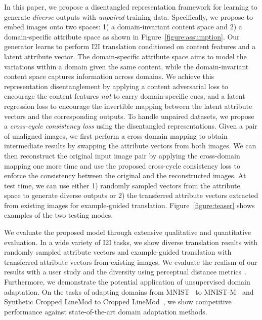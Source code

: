 \documentclass[runningheads]{llncs}
\newcommand{\figref}[1]{Figure~\ref{figure:#1}}
\begin{document}
In this paper, we propose a disentangled representation framework for learning to generate \emph{diverse} outputs with \emph{unpaired} training data.
Specifically, we propose to embed images onto two spaces: 
1) a domain-invariant content space and 2) a domain-specific attribute space as shown in \figref{assumption}.
Our generator learns to perform I2I translation conditioned on content features and a latent attribute vector. 
The domain-specific attribute space aims to model the variations within a domain given the same content, while the domain-invariant content space captures information across domains.
We achieve this representation disentanglement by applying a content adversarial loss to encourage the content features \emph{not} to carry domain-specific cues, and a latent regression loss to encourage the invertible mapping between the latent attribute vectors and the corresponding outputs.
To handle unpaired datasets, we propose a \textit{cross-cycle consistency loss} using the disentangled representations.
Given a pair of unaligned images, we first perform a cross-domain mapping to obtain intermediate results by swapping the attribute vectors from both images.
We can then reconstruct the original input image pair by applying the cross-domain mapping one more time and use the proposed cross-cycle consistency loss to enforce the consistency between the original and the reconstructed images. 
At test time, we can use either 
1) randomly sampled vectors from the attribute space to generate diverse outputs or 
2) the transferred attribute vectors extracted from existing images for example-guided translation.
\figref{teaser} shows examples of the two testing modes.


We evaluate the proposed model through extensive qualitative and quantitative evaluation.
In a wide variety of I2I tasks, we show diverse translation results with randomly sampled attribute vectors and example-guided translation with transferred attribute vectors from existing images.
We evaluate the realism of our results with a user study and the diversity using perceptual distance metrics~\cite{zhang2018perceptual}.
Furthermore, we demonstrate the potential application of unsupervised domain adaptation.
On the tasks of adapting domains from MNIST~\cite{lecun1998MNIST} to MNIST-M~\cite{ganin2016MNISTM} and Synthetic Cropped LineMod to Cropped LineMod~\cite{hinterstoisser2012linemod,wohlhart2015croplinemod}, we show competitive performance against state-of-the-art domain adaptation methods.
 
\end{document}
